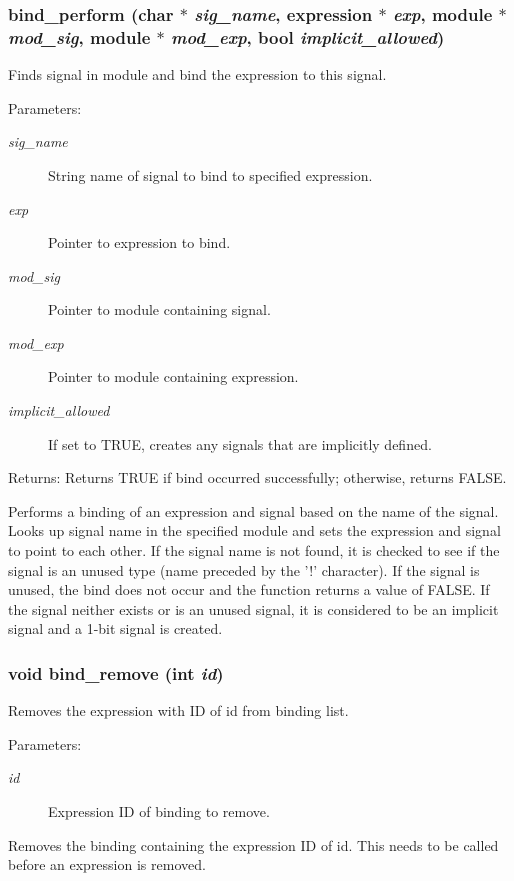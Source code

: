 \subsubsection{ bind\_\-perform (char $\ast$ {\em sig\_\-name}, {\bf expression} $\ast$ {\em exp}, {\bf module} $\ast$ {\em mod\_\-sig}, {\bf module} $\ast$ {\em mod\_\-exp}, {\bf bool} {\em implicit\_\-allowed})}\label{binding_8h_a2}


Finds signal in module and bind the expression to this signal.

\begin{Desc}
\item[Parameters:]
\begin{description}
\item[{\em sig\_\-name}]String name of signal to bind to specified expression. \item[{\em exp}]Pointer to expression to bind. \item[{\em mod\_\-sig}]Pointer to module containing signal. \item[{\em mod\_\-exp}]Pointer to module containing expression. \item[{\em implicit\_\-allowed}]If set to TRUE, creates any signals that are implicitly defined.\end{description}
\end{Desc}
\begin{Desc}
\item[Returns:]Returns TRUE if bind occurred successfully; otherwise, returns FALSE.\end{Desc}
Performs a binding of an expression and signal based on the name of the signal. Looks up signal name in the specified module and sets the expression and signal to point to each other. If the signal name is not found, it is checked to see if the signal is an unused type (name preceded by the '!' character). If the signal is unused, the bind does not occur and the function returns a value of FALSE. If the signal neither exists or is an unused signal, it is considered to be an implicit signal and a 1-bit signal is created. 
\subsubsection{\setlength{\rightskip}{0pt plus 5cm}void bind\_\-remove (int {\em id})}\label{binding_8h_a1}


Removes the expression with ID of id from binding list.

\begin{Desc}
\item[Parameters:]
\begin{description}
\item[{\em id}]Expression ID of binding to remove.\end{description}
\end{Desc}
Removes the binding containing the expression ID of id. This needs to be called before an expression is removed. 